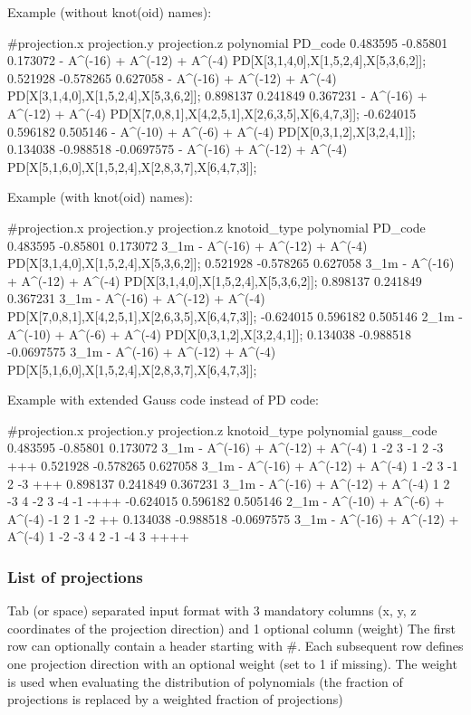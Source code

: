 Example (without knot(oid) names):
\begin{lstlistingverysmall}
#projection.x  projection.y  projection.z  polynomial                    PD_code
0.483595       -0.85801      0.173072      - A^(-16) + A^(-12) + A^(-4)  PD[X[3,1,4,0],X[1,5,2,4],X[5,3,6,2]];
0.521928       -0.578265     0.627058      - A^(-16) + A^(-12) + A^(-4)  PD[X[3,1,4,0],X[1,5,2,4],X[5,3,6,2]];
0.898137       0.241849      0.367231      - A^(-16) + A^(-12) + A^(-4)  PD[X[7,0,8,1],X[4,2,5,1],X[2,6,3,5],X[6,4,7,3]];
-0.624015      0.596182      0.505146      - A^(-10) + A^(-6) + A^(-4)   PD[X[0,3,1,2],X[3,2,4,1]];
0.134038       -0.988518     -0.0697575    - A^(-16) + A^(-12) + A^(-4)  PD[X[5,1,6,0],X[1,5,2,4],X[2,8,3,7],X[6,4,7,3]];
\end{lstlistingverysmall}
Example (with knot(oid) names):
\begin{lstlistingverysmall}
#projection.x projection.y projection.z knotoid_type polynomial                   PD_code
0.483595      -0.85801     0.173072     3_1m        - A^(-16) + A^(-12) + A^(-4)  PD[X[3,1,4,0],X[1,5,2,4],X[5,3,6,2]];
0.521928      -0.578265    0.627058     3_1m        - A^(-16) + A^(-12) + A^(-4)  PD[X[3,1,4,0],X[1,5,2,4],X[5,3,6,2]];
0.898137      0.241849     0.367231     3_1m        - A^(-16) + A^(-12) + A^(-4)  PD[X[7,0,8,1],X[4,2,5,1],X[2,6,3,5],X[6,4,7,3]];
-0.624015     0.596182     0.505146     2_1m        - A^(-10) + A^(-6) + A^(-4)   PD[X[0,3,1,2],X[3,2,4,1]];
0.134038      -0.988518    -0.0697575   3_1m        - A^(-16) + A^(-12) + A^(-4)  PD[X[5,1,6,0],X[1,5,2,4],X[2,8,3,7],X[6,4,7,3]];
\end{lstlistingverysmall}
Example with extended Gauss code instead of PD code:
\begin{lstlistingverysmall}
#projection.x projection.y projection.z knotoid_type polynomial                    gauss_code
0.483595      -0.85801     0.173072     3_1m        - A^(-16) + A^(-12) + A^(-4)   1 -2 3 -1 2 -3 +++
0.521928      -0.578265    0.627058     3_1m        - A^(-16) + A^(-12) + A^(-4)   1 -2 3 -1 2 -3 +++
0.898137      0.241849     0.367231     3_1m        - A^(-16) + A^(-12) + A^(-4)   1 2 -3 4 -2 3 -4 -1 -+++
-0.624015     0.596182     0.505146     2_1m        - A^(-10) + A^(-6) + A^(-4)    -1 2 1 -2 ++
0.134038      -0.988518    -0.0697575   3_1m        - A^(-16) + A^(-12) + A^(-4)   1 -2 -3 4 2 -1 -4 3 ++++
\end{lstlistingverysmall}


\subsubsection{\label{sec:format:projections}List of projections}
Tab (or space) separated input format with 3 mandatory columns (x, y, z coordinates of the projection direction) and 1 optional column (weight)
The first row can optionally contain a header starting with \#.
Each subsequent row defines one projection direction with an optional weight (set to 1 if missing). The weight is used when evaluating the distribution of polynomials (the fraction of projections is replaced by a weighted fraction of projections)


